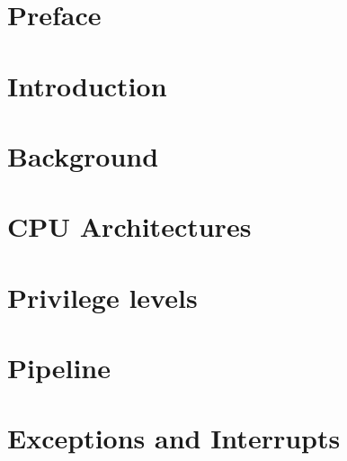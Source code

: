 \documentclass[11pt, twocolumn]{article}
\begin{document}
\newpage

\section*{Preface}


\newpage

\twocolumn

\tableofcontents

\onecolumn
\newpage
\twocolumn

\clearpage
{}
\setcounter{page}{1}

\noindent

\section{Introduction}


\section{Background}


\section{CPU Architectures}



\section{Privilege levels}


\section{Pipeline}


\section{Exceptions and Interrupts}

\end{document}

